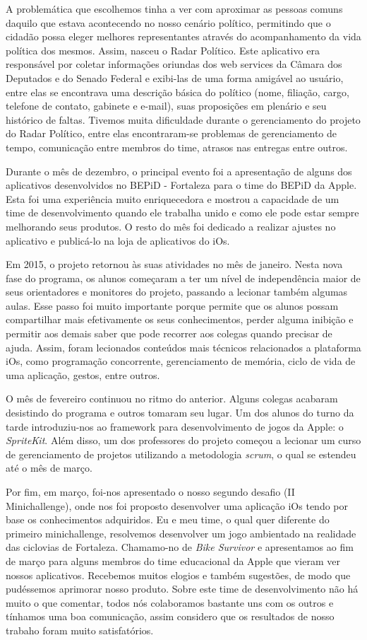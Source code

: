 \documentclass[
	12pt,				%
	openright,			%
	twoside,			%
	a4paper,			%
	english,			%
	french,				%
	spanish,			%
	brazil,				%
	]{abntex2}
\begin{document}
A problemática que escolhemos tinha a ver com aproximar as pessoas comuns daquilo que estava acontecendo no nosso cenário político, permitindo que o cidadão possa eleger melhores representantes através do acompanhamento da vida política dos mesmos. Assim, nasceu o Radar Político. Este aplicativo era responsável por coletar informações oriundas dos web services da Câmara dos Deputados e do Senado Federal e exibi-las de uma forma amigável ao usuário, entre elas se encontrava uma descrição básica do político (nome, filiação, cargo, telefone de contato, gabinete e e-mail), suas proposições em plenário e seu histórico de faltas. Tivemos muita dificuldade durante o gerenciamento do projeto do Radar Político, entre elas encontraram-se problemas de gerenciamento de tempo, comunicação entre membros do time, atrasos nas entregas entre outros.

Durante o mês de dezembro, o principal evento foi a apresentação de alguns dos aplicativos desenvolvidos no BEPiD - Fortaleza para o time do BEPiD da Apple. Esta foi uma experiência muito enriquecedora e mostrou a capacidade de um time de desenvolvimento quando ele trabalha unido e como ele pode estar sempre melhorando seus produtos. O resto do mês foi dedicado a realizar ajustes no aplicativo e publicá-lo na loja de aplicativos do iOs.

Em 2015, o projeto retornou às suas atividades no mês de janeiro. Nesta nova fase do programa, os alunos começaram a ter um nível de independência maior de seus orientadores e monitores do projeto, passando a lecionar também algumas aulas. Esse passo foi muito importante porque permite que os alunos possam compartilhar mais efetivamente os seus conhecimentos, perder alguma inibição e permitir aos demais saber que pode recorrer aos colegas quando precisar de ajuda. Assim, foram lecionados conteúdos mais técnicos relacionados a plataforma iOs, como programação concorrente, gerenciamento de memória, ciclo de vida de uma aplicação, gestos, entre outros. 

O mês de fevereiro continuou no ritmo do anterior. Alguns colegas acabaram desistindo do programa e outros tomaram seu lugar. Um dos alunos do turno da tarde introduziu-nos ao framework para desenvolvimento de jogos da Apple: o \textit{SpriteKit}. Além disso, um dos professores do projeto começou a lecionar um curso de gerenciamento de projetos utilizando a metodologia \textit{scrum}, o qual se estendeu até o mês de março.

Por fim, em março, foi-nos apresentado o nosso segundo desafio (II Minichallenge), onde nos foi proposto desenvolver uma aplicação iOs tendo por base os conhecimentos adquiridos. Eu e meu time, o qual quer diferente do primeiro minichallenge, resolvemos desenvolver um jogo ambientado na realidade das ciclovias de Fortaleza. Chamamo-no de \textit{Bike Survivor} e apresentamos ao fim de março para alguns membros do time educacional da Apple que vieram ver nossos aplicativos. Recebemos muitos elogios e também sugestões, de modo que pudéssemos aprimorar nosso produto. Sobre este time de desenvolvimento não há muito o que comentar, todos nós colaboramos bastante uns com os outros e tínhamos uma boa comunicação, assim considero que os resultados de nosso trabaho foram muito satisfatórios.
\end{document}
